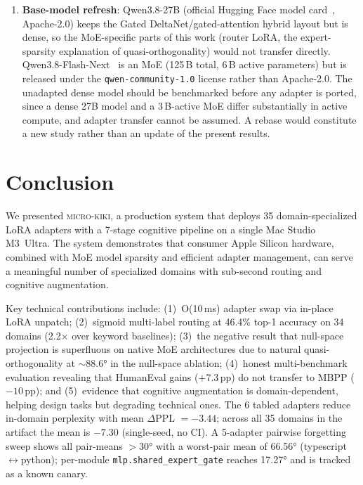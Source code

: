 \documentclass[11pt,a4paper]{article}
\begin{document}
\begin{enumerate}[nosep]
  \item \textbf{Base-model refresh}: Qwen3.8-27B (official Hugging Face model card~\citep{qwen2026qwen38_27b}, Apache-2.0) keeps the Gated DeltaNet/gated-attention hybrid layout but is dense, so the MoE-specific parts of this work (router LoRA, the expert-sparsity explanation of quasi-orthogonality) would not transfer directly. Qwen3.8-Flash-Next~\citep{qwen2026qwen38flashnext} is an MoE (125\,B total, 6\,B active parameters) but is released under the \texttt{qwen-community-1.0} license rather than Apache-2.0. The unadapted dense model should be benchmarked before any adapter is ported, since a dense 27B model and a 3\,B-active MoE differ substantially in active compute, and adapter transfer cannot be assumed. A rebase would constitute a new study rather than an update of the present results.
\end{enumerate}

\section{Conclusion}
\label{sec:conclusion}

We presented \textsc{micro-kiki}, a production system that deploys 35 domain-specialized LoRA adapters with a 7-stage cognitive pipeline on a single Mac Studio M3~Ultra. The system demonstrates that consumer Apple Silicon hardware, combined with MoE model sparsity and efficient adapter management, can serve a meaningful number of specialized domains with sub-second routing and cognitive augmentation.

Key technical contributions include: (1)~O(10\,ms) adapter swap via in-place LoRA unpatch; (2)~sigmoid multi-label routing at 46.4\% top-1 accuracy on 34 domains (2.2$\times$ over keyword baselines); (3)~the negative result that null-space projection is superfluous on native MoE architectures due to natural quasi-orthogonality at ${\sim}88.6$° in the null-space ablation; (4)~honest multi-benchmark evaluation revealing that HumanEval gains ($+7.3$\,pp) do not transfer to MBPP ($-10$\,pp); and (5)~evidence that cognitive augmentation is domain-dependent, helping design tasks but degrading technical ones. The 6 tabled adapters reduce in-domain perplexity with mean $\Delta$PPL $= -3.44$; across all 35 domains in the artifact the mean is $-7.30$ (single-seed, no CI). A 5-adapter pairwise forgetting sweep shows all pair-means ${>}30$° with a worst-pair mean of 66.56° (typescript$\leftrightarrow$python); per-module \texttt{mlp.shared\_expert\_gate} reaches 17.27° and is tracked as a known canary.
\end{document}

